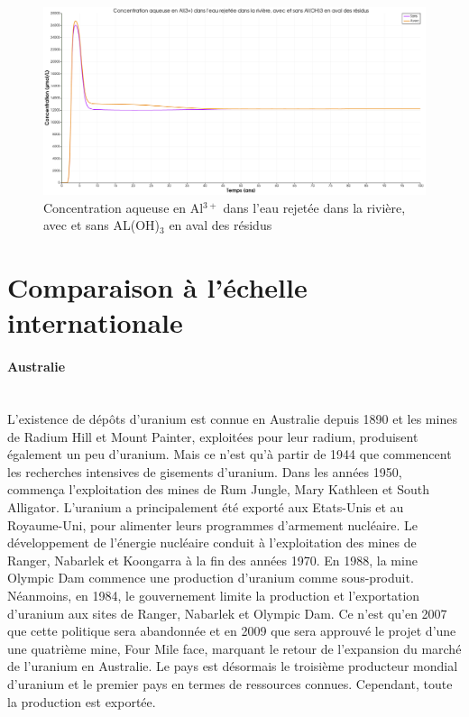 \documentclass{article}
\begin{document}
\begin{figure}[H]
    \centering
    \includegraphics[width=0.5\linewidth]{III_B_2_24.png}
    \caption{Concentration aqueuse en Al$^{3+}$ dans l'eau rejetée dans la rivière, avec et sans AL(OH)$_3$ en aval des résidus}
    \label{fig:Al_riviere_comparaison_Al}
\end{figure}


\newpage
\section{Comparaison à l'échelle internationale}
\label{annexe:comp_internationale}

\paragraph{Australie \\ \\}

L’existence de dépôts d'uranium est connue en Australie depuis 1890 et les mines de Radium Hill et Mount Painter, exploitées pour leur radium, produisent également un peu d’uranium. Mais ce n’est qu’à partir de 1944 que commencent les recherches intensives de gisements d’uranium. Dans les années 1950, commença l’exploitation des mines de Rum Jungle, Mary Kathleen et South Alligator. L’uranium a principalement été exporté aux Etats-Unis et au Royaume-Uni, pour alimenter leurs programmes d’armement nucléaire. Le développement de l’énergie nucléaire conduit à l’exploitation des mines de Ranger, Nabarlek et Koongarra à la fin des années 1970. En 1988, la mine Olympic Dam commence une production d’uranium comme sous-produit.
Néanmoins, en 1984, le gouvernement limite la production et l’exportation d’uranium aux sites de Ranger, Nabarlek et Olympic Dam. Ce n’est qu’en 2007 que cette politique sera abandonnée et en 2009 que sera approuvé le projet d’une une quatrième mine, Four Mile face, marquant le retour de l’expansion du marché de l’uranium en Australie.
Le pays est désormais le troisième producteur mondial d’uranium et le premier pays en termes de ressources connues. Cependant, toute la production est exportée.
\end{document}
